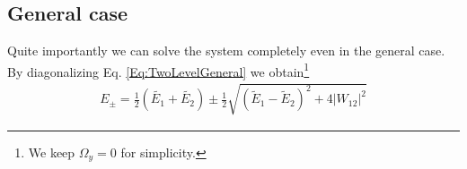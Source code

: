 \subsection{General case}

Quite importantly we can solve the system completely even in the general case. By diagonalizing  Eq. \eqref{Eq:TwoLevelGeneral} we obtain\footnote{We keep $\Omega_y =0$ for simplicity.}
\begin{align}\label{eq:Epm}
 E_\pm = \frac{1}{2}\left(\tilde{E_1}+\tilde{E_2}\right) \pm \frac{1}{2} \sqrt{\left(\tilde{E}_1-\tilde{E}_2\right)^2+4 \left|W_{12}\right|^2}
\end{align}